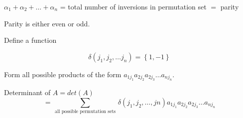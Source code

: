 $\alpha_1 + \alpha_2 + \ldots + \alpha_{n}$ = total number of inversions in permutation set $=$ parity

Parity is either even or odd.

Define a function

\[\delta(j_1,j_2,\ldots j_{n}) = \left\{ 1 , -1 \right\}  \]

Form all possible products of the form $a_{1j_{1}} a_{2j_{2}} a_{2j_{3}} \ldots a_{nj_{n}}$.

Determinant of $A = det(A)$
\[= \sum_{\:\text{all possible permutation sets}\:} \delta(j_1,j_2,\ldots,jn)a_{1j_{1}} a_{2j_{2}} a_{2j_{3}} \ldots a_{nj_{n}}\]







\newpage


